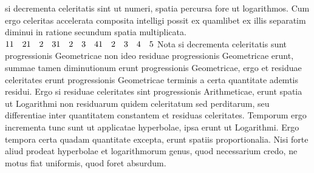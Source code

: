 %
si decrementa celeritatis sint ut numeri, spatia percursa fore ut logarithmos. Cum ergo celeritas accelerata composita intelligi possit ex 
quamlibet ex illis separatim diminui in ratione secundum spatia multiplicata.\\
$\displaystyle 1\\
1 \quad 2\\
1 \quad 2 \quad 3\\
1 \quad 2 \quad 3 \quad 4\\
1 \quad 2 \quad 3 \quad 4 \quad 5$
\pend
\pstart
%
%
Nota si decrementa celeritatis sunt progressionis Geometricae non ideo residuae progressionis Geometricae erunt, summae tamen diminutionum erunt progressionis Geometricae, ergo et residuae celeritates erunt progressionis Geometricae terminis a certa quantitate ademtis residui. Ergo si residuae celeritates sint progressionis Arithmeticae, 
%
%
erunt spatia ut Logarithmi non residuarum quidem celeritatum sed perditarum, seu differentiae inter quantitatem constantem et residuas celeritates. Temporum ergo incrementa tunc sunt ut applicatae hyperbolae, 
ipsa erunt ut Logarithmi. Ergo tempora certa quadam quantitate excepta, erunt spatiis proportionalia. Nisi forte aliud prodeat hyperbolae et logarithmorum genus, quod necessarium credo, ne motus fiat uniformis, quod foret absurdum.
\pend